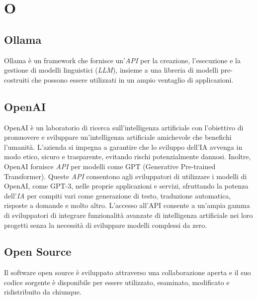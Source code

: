 \chapter{O}

\section{Ollama}
Ollama è un framework che fornisce un’\emph{API} per la creazione, l’esecuzione e la gestione di modelli linguistici (\emph{LLM}), insieme a una libreria di modelli pre-costruiti che possono essere utilizzati in un ampio ventaglio di applicazioni.

\section{OpenAI}
OpenAI è un laboratorio di ricerca sull'intelligenza artificiale con l'obiettivo di promuovere e sviluppare un'intelligenza artificiale amichevole che benefichi l'umanità. L'azienda si impegna a garantire che lo sviluppo dell'IA avvenga in modo etico, sicuro e trasparente, evitando rischi potenzialmente dannosi.
Inoltre, OpenAI fornisce \emph{API} per modelli come GPT (Generative Pre-trained Transformer). Queste \emph{API} consentono agli sviluppatori di utilizzare i modelli di OpenAI, come GPT-3, nelle proprie applicazioni e servizi, sfruttando la potenza dell'\emph{IA} per compiti vari come generazione di testo, traduzione automatica, risposte a domande e molto altro. L'accesso all'API consente a un'ampia gamma di sviluppatori di integrare funzionalità avanzate di intelligenza artificiale nei loro progetti senza la necessità di sviluppare modelli complessi da zero.

\section{Open Source}
Il software open source è sviluppato attraverso una collaborazione aperta e il suo codice sorgente è disponibile per essere utilizzato, esaminato, modificato e ridistribuito da chiunque. 

